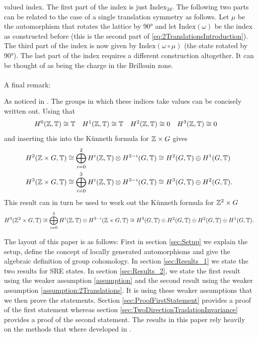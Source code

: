 \documentclass[12pt,a4paper,twoside]{article}
\numberwithin{equation}{section}
\begin{document}
valued index. The first part of the index is just $\textrm{Index}_{2d}$. The following two parts can be related to the case of a single translation symmetry as follows. Let $\mu$ be the automorphism that rotates the lattice by 90° and let $\textrm{Index}(\omega)$ be the index as constructed before (this is the second part of \ref{eq:2TranslationsIntroduction}). The third part of the index is now given by $\textrm{Index}(\omega\circ\mu)$ (the state rotated by 90°). The last part of the index requires a different construction altogether. It can be thought of as being the charge in the Brillouin zone.
\\\\
A final remark:
\begin{remark}
	As noticed in \cite{Chen_2013}. The groups in which these indices take values can be concisely written out. Using that
	\begin{align}
	H^0(\mathbb Z,\mathbb T)&\cong \mathbb T& H^1(\mathbb Z,\mathbb T)&\cong \mathbb T& H^2(\mathbb Z,\mathbb T)&\cong 0&H^3(\mathbb Z,\mathbb T)&\cong 0
	\end{align}
	and inserting this into the K\"unneth formula for $\mathbb Z\times G$ gives
	\begin{align}
	H^2(\mathbb Z \times G,\mathbb T)&\cong \bigoplus_{i=0}^2 H^i(\mathbb Z,\mathbb T)\otimes H^{2-i}(G,\mathbb T)\cong H^2(G,\mathbb T)\oplus H^1(G,\mathbb T)\\
	H^3(\mathbb Z \times G,\mathbb T)&\cong \bigoplus_{i=0}^3 H^i(\mathbb Z,\mathbb T)\otimes H^{3-i}(G,\mathbb T)\cong H^3(G,\mathbb T)\oplus H^2(G,\mathbb T).
	\end{align}
	This result can in turn be used to work out the K\"unneth formula for $\mathbb Z^2\times G$
	\begin{equation}
	H^3(\mathbb Z^2\times G,\mathbb T)\cong \bigoplus_{i=0}^3 H^i(\mathbb Z,\mathbb T)\otimes H^{3-i}(\mathbb Z\times G,\mathbb T)\cong H^3(G,\mathbb T)\oplus H^2(G,\mathbb T)\oplus H^2(G,\mathbb T)\oplus H^1(G,\mathbb T).
	\end{equation}
\end{remark}
The layout of this paper is as follows: First in section \ref{sec:Setup} we explain the setup, define the concept of locally generated automorphisms and give the algebraic definition of group cohomology. In section \ref{sec:Results_1} we state the two results for SRE states. In section \ref{sec:Results_2}, we state the first result using the weaker assumption \ref{assumption} and the second result using the weaker assumption \ref{assumption:2Translations}. It is using these weaker assumptions that we then prove the statements. Section \ref{sec:ProofFirstStatement} provides a proof of the first statement whereas section \ref{sec:TwoDirectionTraslationInvariance} provides a proof of the second statement. The results in this paper rely heavily on the methods that where developed in \cite{ogata2021h3gmathbb}.
\end{document}
